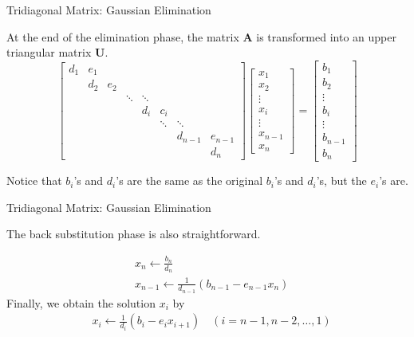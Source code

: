 \documentclass{beamer}
\begin{document}
\begin{frame}{Tridiagonal  Matrix: Gaussian Elimination}

   At the end of the elimination phase, the matrix $\mathbf{A}$ is transformed into an upper triangular matrix $\mathbf{U}$.
    $$
  \left[\begin{array}{llllllll}
  d_1 & e_1 & & & & & & \\
  & d_2 & e_2 & & & & & \\
  & & & \ddots & \ddots & & & \\
  & & & & d_i & c_i & & \\
  & & & & & \ddots & \ddots & \\
  & & & & & & d_{n-1} & e_{n-1} \\
  & & & & & & & d_n
  \end{array}\right]\left[\begin{array}{l}
  x_1 \\
  x_2 \\
  \vdots \\
  x_i \\
  \vdots \\
  x_{n-1} \\
  x_n
  \end{array}\right]=\left[\begin{array}{l}
  b_1 \\
  b_2 \\
  \vdots \\
  b_i \\
  \vdots \\
  b_{n-1} \\
  b_n
  \end{array}\right]
  $$

  Notice that $b_i$'s and $d_i$'s are the same as the original $b_i$'s and $d_i$'s, but the $e_i$'s are. 
\end{frame}

\begin{frame}{Tridiagonal  Matrix: Gaussian Elimination}

  The back substitution phase is also straightforward.

\begin{align}
& x_n \leftarrow \frac{b_n}{d_n} \\
& x_{n-1} \leftarrow \frac{1}{d_{n-1}}\left(b_{n-1}-e_{n-1} x_n\right)
\end{align}
Finally, we obtain the solution $x_i$ by
\begin{align}
& x_i \leftarrow \frac{1}{d_i}\left(b_i-e_i x_{i+1}\right) \quad (i=n-1,n-2,\ldots,1)
\end{align}

\end{frame}
\end{document}
